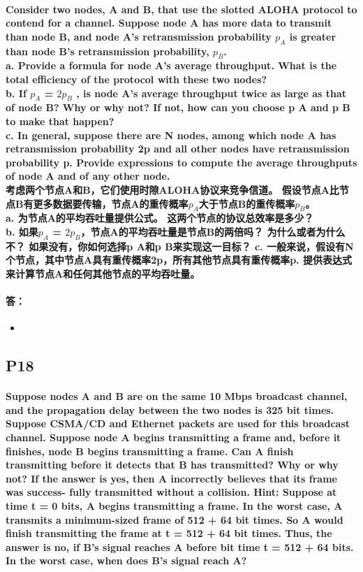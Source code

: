 \documentclass[a4paper]{ctexart}
\begin{document}
\paragraph*{Consider two nodes, A and B, that use the slotted ALOHA protocol to contend for a channel. Suppose node A has more data to transmit than node B, and node A’s retransmission probability $p_A$ is greater than node B’s retransmission probability, $p_B$.\\
a. Provide a formula for node A’s average throughput. What is the total efficiency of the protocol with these two nodes?\\
b. If $p_A$ = $2p_B$ , is node A’s average throughput twice as large as that of node B? Why or why not? If not, how can you choose p A and p B to make that happen?\\
c. In general, suppose there are N nodes, among which node A has retransmission probability 2p and all other nodes have retransmission probability p. Provide expressions to compute the average throughputs of node A and of any other node.\\
考虑两个节点A和B，它们使用时隙ALOHA协议来竞争信道。 假设节点A比节点B有更多数据要传输，节点A的重传概率$ p_A $大于节点B的重传概率$ p_B $。\\
a. 为节点A的平均吞吐量提供公式。 这两个节点的协议总效率是多少？\\
b. 如果$ p_A $ = $ 2p_B $，节点A的平均吞吐量是节点B的两倍吗？ 为什么或者为什么不？ 如果没有，你如何选择p A和p B来实现这一目标？
c. 一般来说，假设有N个节点，其中节点A具有重传概率2p，所有其他节点具有重传概率p. 提供表达式来计算节点A和任何其他节点的平均吞吐量。}
\paragraph*{答：} 
\begin{itemize}
    \item 
\end{itemize}

\subsection*{P18}
\paragraph*{Suppose nodes A and B are on the same 10 Mbps broadcast channel, and the
propagation delay between the two nodes is 325 bit times. Suppose CSMA/CD
and Ethernet packets are used for this broadcast channel. Suppose node A begins
transmitting a frame and, before it finishes, node B begins transmitting a frame.
Can A finish transmitting before it detects that B has transmitted? Why or why
not? If the answer is yes, then A incorrectly believes that its frame was success-
fully transmitted without a collision. Hint: Suppose at time t = 0 bits, A begins
transmitting a frame. In the worst case, A transmits a minimum-sized frame of
512 + 64 bit times. So A would finish transmitting the frame at t = 512 + 64 bit
times. Thus, the answer is no, if B’s signal reaches A before bit time t = 512 + 64
bits. In the worst case, when does B’s signal reach A?\\}
\end{document}
